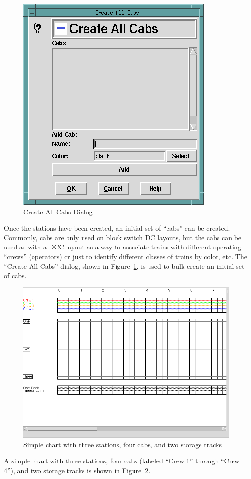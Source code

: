 \begin{figure}[hbpt]
\begin{centering}
\includegraphics{TTCreateAllCabs.png}
\caption{Create All Cabs Dialog}
\label{fig:tt:CreateAllCabsDialog}
\end{centering}
\end{figure}
Once the stations have been created, an initial set of ``cabs'' can be
created.  Commonly, cabs are only used on block switch DC layouts, but
the cabs can be used as with a  DCC layout as a way to associate trains
with different operating ``crews'' (operators) or just to identify
different classes of trains by color, etc.  The ``Create All Cabs''
dialog, shown in Figure~\ref{fig:tt:CreateAllCabsDialog}, is used to
bulk create an initial set of cabs.

\begin{figure}[hbpt]
\begin{centering}   
\includegraphics[width=5in]{TTChart3station.png}
\caption{Simple chart with three stations, four cabs, and two storage
tracks}
\label{fig:tt:Chart3station}
\end{centering}
\end{figure}   
A simple chart with three stations, four cabs (labeled ``Crew 1''
through ``Crew 4''), and two storage tracks is shown in
Figure~\ref{fig:tt:Chart3station}. 

